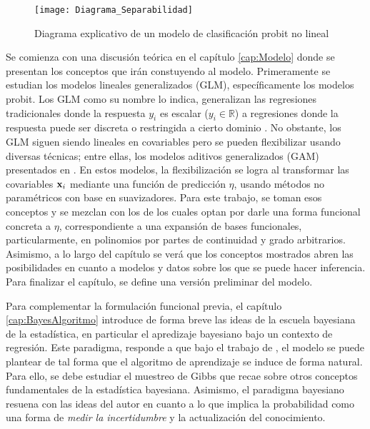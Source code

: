 \documentclass[../Main/Main.tex]{subfiles}
\begin{document}
\begin{figure}[h]
  \centering
      \texttt{[image: Diagrama\_Separabilidad]}
  \caption{Diagrama explicativo de un modelo de clasificación probit no lineal}
  \label{fig:DiagramaIntro}
\end{figure}

Se comienza con una discusión teórica en el capítulo \ref{cap:Modelo} donde se presentan los conceptos que irán constuyendo al modelo. Primeramente se estudian los modelos lineales generalizados (GLM),  específicamente los modelos probit. Los GLM como su nombre lo indica, generalizan las regresiones tradicionales donde la respuesta $y_i$ es escalar ($y_i \in \mathbb{R}$) a regresiones donde la respuesta puede ser discreta o restringida a cierto dominio \autocite{maccullagh1989generalized}. No obstante, los GLM siguen siendo lineales en covariables pero se pueden flexibilizar usando diversas técnicas; entre ellas, los modelos aditivos generalizados (GAM) presentados en \citet{hastie1986generalized}. En estos modelos, la flexibilización se logra al transformar las covariables $\mathbf{x}_i$ mediante una función de predicción $\eta$, usando métodos no paramétricos con base en suavizadores. Para este trabajo, se toman esos conceptos y se mezclan con los de \citet{mallik1998automatic} los cuales optan por darle una forma funcional concreta a $\eta$, correspondiente a una expansión de bases funcionales, particularmente, en polinomios por partes de continuidad y grado arbitrarios.  Asimismo, a lo largo del capítulo se verá que los conceptos mostrados abren las posibilidades en cuanto a modelos y datos sobre los que se puede hacer inferencia. Para finalizar el capítulo, se define una versión preliminar del modelo. %

Para complementar la formulación funcional previa, el capítulo \ref{cap:BayesAlgoritmo} introduce de forma breve las ideas de la escuela bayesiana de la estadística, en particular el apredizaje bayesiano bajo un contexto de regresión. Este paradigma, responde a que bajo el trabajo de \citet{albert1993bayesian}, el modelo se puede plantear de tal forma que el algoritmo de aprendizaje se induce de forma natural. Para ello, se debe estudiar el muestreo de Gibbs que recae sobre otros conceptos fundamentales de la estadística bayesiana. Asimismo, el paradigma bayesiano resuena con las ideas del autor en cuanto a lo que implica la probabilidad como una forma de \emph{medir la incertidumbre} y la actualización del conocimiento.
\end{document}
